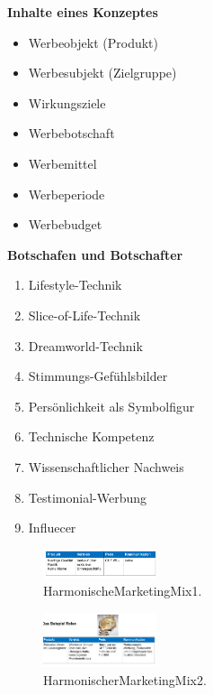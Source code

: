 \documentclass[../ZF_Wing.tex]{subfiles}
\begin{document}
\begin{multicols}{2}
\textbf{Inhalte eines Konzeptes}

\begin{itemize}
	\item Werbeobjekt (Produkt)
	\item Werbesubjekt (Zielgruppe)
	\item Wirkungsziele
	\item Werbebotschaft
	\item Werbemittel
	\item Werbeperiode
	\item Werbebudget
\end{itemize}

\columnbreak

\textbf{Botschafen und Botschafter}
\begin{enumerate}
	\item Lifestyle-Technik
	\item Slice-of-Life-Technik
	\item Dreamworld-Technik
	\item Stimmungs-Gefühlsbilder
	\item Persönlichkeit als Symbolfigur
	\item Technische Kompetenz
	\item Wissenschaftlicher Nachweis
	\item Testimonial-Werbung
	\item Influecer
\end{enumerate}




\end{multicols}

\begin{multicols}{2}

\begin{figure}[H]

\includegraphics[width=0.3\textwidth]{Resources/Image/HarmonischeMarketingMix1.png}
\caption{\label{fig:HarmonischeMarketingMix1}HarmonischeMarketingMix1.}
\end{figure}

\columnbreak

\begin{figure}[H]

\includegraphics[width=0.3\textwidth]{Resources/Image/HarmonischerMarketingMix2.png}
\caption{\label{fig:HarmonischerMarketingMix2}HarmonischerMarketingMix2.}
\end{figure}


\end{multicols}
\end{document}
